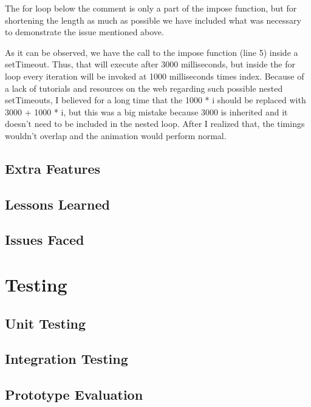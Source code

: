 \documentclass{l4proj}
\begin{document}
\begin{itemize}
\pagebreak

The for loop below the comment is only a part of the impose function, but for shortening the length as much as possible
we have included what was necessary to demonstrate the issue mentioned above. 

As it can be observed, we have the call to the impose function (line 5) inside a setTimeout. Thus, that will execute
after 3000 milliseconds, but inside the for loop every iteration will be invoked at 1000 milliseconds times index.
Because of a lack of tutorials and resources on the web regarding such possible nested setTimeouts, I believed for a
long time that the 1000 * i should be replaced with 3000 + 1000 * i, but this was a big mistake because 3000 is
inherited and it doesn't need to be included in the nested loop. After I realized that, the timings wouldn't overlap
and the animation would perform normal.

\section{Extra Features}

\section{Lessons Learned}

\section{Issues Faced}


\chapter{Testing}
\label{testing}

\section{Unit Testing}

\section{Integration Testing}

\section{Prototype Evaluation}


\end{itemize}
\end{document}
